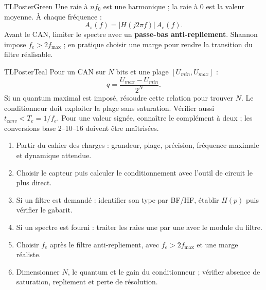 \documentclass[10pt,a3paper]{article}
\begin{document}
\begin{minipage}[t]{0.49\linewidth}
\begin{TLPosterBloc}{TLPosterGreen}
Une raie à $nf_0$ est une harmonique ; la raie à $0$ est la valeur moyenne. À chaque fréquence :
\[
A_s(f)=|H(j2\pi f)|\,A_e(f).
\]
Avant le CAN, limiter le spectre avec un \textbf{passe-bas anti-repliement}. Shannon impose $f_e>2f_{\max}$ ; en pratique choisir une marge pour rendre la transition du filtre réalisable.
\end{TLPosterBloc}
\begin{TLPosterBloc}{TLPosterTeal}
Pour un CAN sur $N$ bits et une plage $[U_{min},U_{max}]$ :
\[
q=\frac{U_{max}-U_{min}}{2^N}.
\]
Si un quantum maximal est imposé, résoudre cette relation pour trouver $N$. Le conditionneur doit exploiter la plage sans saturation. Vérifier aussi $t_{conv}<T_e=1/f_e$. Pour une valeur signée, connaître le complément à deux ; les conversions base 2--10--16 doivent être maîtrisées.
\end{TLPosterBloc}
\end{minipage}
\vfill
\begin{TLPosterMethode}
\begin{enumerate}
  \item Partir du cahier des charges : grandeur, plage, précision, fréquence maximale et dynamique attendue.
  \item Choisir le capteur puis calculer le conditionnement avec l'outil de circuit le plus direct.
  \item Si un filtre est demandé : identifier son type par BF/HF, établir $H(p)$ puis vérifier le gabarit.
  \item Si un spectre est fourni : traiter les raies une par une avec le module du filtre.
  \item Choisir $f_e$ après le filtre anti-repliement, avec $f_e>2f_{\max}$ et une marge réaliste.
  \item Dimensionner $N$, le quantum et le gain du conditionneur ; vérifier absence de saturation, repliement et perte de résolution.
\end{enumerate}
\end{TLPosterMethode}
\vfill
{}
\end{document}

